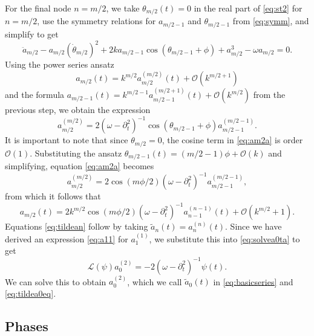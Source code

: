 \documentclass[11pt,reqno]{amsart}
\def\calL{{\mathcal L}}
\begin{document}
For the final node $n=m/2$, we take $\theta_{m/2}(t) = 0$ in the real part of \cref{eq:st2} for $n = m/2$, use the symmetry relations for $a_{m/2-1}$ and $\theta_{m/2-1}$ from \cref{eq:symm}, and simplify to get
\[
\ddot a_{m/2} - a_{m/2} (\dot \theta_{m/2})^2 + 
2 k a_{m/2-1}\cos( \theta_{m/2-1} + \phi) + a_{m/2}^3 - \omega a_{m/2} = 0.
\]
Using the power series ansatz
\[
a_{m/2}(t) = k^{m/2} a_{m/2}^{({m/2})}(t) + \mathcal{O}(k^{m/2+1})
\]
and the formula $a_{m/2-1}(t) = k^{m/2-1}a_{m/2-1}^{(m/2+1)}(t) + \mathcal{O}(k^{m/2})$ from the previous step, we obtain the expression
\begin{equation}\label{eq:am2a}
a_{m/2}^{({m/2})} = 2 (\omega - \partial_t^2)^{-1}\cos( \theta_{m/2-1} + \phi) a_{m/2-1}^{(m/2-1)}.
\end{equation}
It is important to note that since $\theta_{m/2} = 0$, the cosine term in \cref{eq:am2a} is order $\mathcal{O}(1)$. Substituting the ansatz $\theta_{m/2-1}(t) = (m/2-1)\phi + \mathcal{O}(k)$ and simplifying, equation \cref{eq:am2a} becomes
\begin{equation}\label{eq:am2}
a_{m/2}^{({m/2})} = 2 \cos( m\phi/2)(\omega - \partial_t^2)^{-1} a_{m/2-1}^{(m/2-1)},
\end{equation}
from which it follows that
\begin{equation}\label{eq:am2eq}
a_{m/2}(t) = 2 k^{m/2} \cos\left( m \phi / 2\right) (\omega - \partial_t^2)^{-1} a_{n-1}^{(n-1)}(t) + \mathcal{O}(k^{m/2}+1).
\end{equation}
Equations \cref{eq:tildean} follow by taking $\tilde{a}_n(t) = a_n^{(n)}(t)$. Since we have derived an expression \cref{eq:a11} for $a_1^{(1)}$, we substitute this into \cref{eq:solvea0ta} to get 
\[
\calL(\psi) a_0^{(2)} = -2 (\omega - \partial_t^2)^{-1} \psi(t).
\]
We can solve this to obtain $a_0^{(2)}$, which we call $\tilde{a}_0(t)$ in \cref{eq:basicseries} and \cref{eq:tildea0eq}.

\subsection{Phases}
\end{document}
